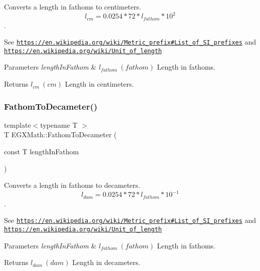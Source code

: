 Converts a length in fathoms to centimeters. \[ l_{cm}=0.0254 * 72 * l_{fathom} * 10^{2} \]. 

See \href{https://en.wikipedia.org/wiki/Metric_prefix#List_of_SI_prefixes}{\tt https\+://en.\+wikipedia.\+org/wiki/\+Metric\+\_\+prefix\#\+List\+\_\+of\+\_\+\+S\+I\+\_\+prefixes} and \href{https://en.wikipedia.org/wiki/Unit_of_length}{\tt https\+://en.\+wikipedia.\+org/wiki/\+Unit\+\_\+of\+\_\+length} 
\begin{DoxyParams}{Parameters}
{\em length\+In\+Fathom} & $ l_{fathom}\ (fathom)$ Length in fathoms. \\
\hline
\end{DoxyParams}
\begin{DoxyReturn}{Returns}
$ l_{cm}\ (cm)$ Length in centimeters. 
\end{DoxyReturn}
\mbox{\label{group___e_g_x_math-_conversions-_length_conversions-_imperial-_fathom-_s_i_ga58364998b467b74922de64f4e2f92825}} 
\subsubsection{\texorpdfstring{Fathom\+To\+Decameter()}{FathomToDecameter()}}
{\footnotesize\ttfamily template$<$typename T $>$ \\
T E\+G\+X\+Math\+::\+Fathom\+To\+Decameter (\begin{DoxyParamCaption}\item[{const T}]{length\+In\+Fathom }\end{DoxyParamCaption})}



Converts a length in fathoms to decameters. \[ l_{dam}=0.0254 * 72 * l_{fathom} * 10^{-1} \]. 

See \href{https://en.wikipedia.org/wiki/Metric_prefix#List_of_SI_prefixes}{\tt https\+://en.\+wikipedia.\+org/wiki/\+Metric\+\_\+prefix\#\+List\+\_\+of\+\_\+\+S\+I\+\_\+prefixes} and \href{https://en.wikipedia.org/wiki/Unit_of_length}{\tt https\+://en.\+wikipedia.\+org/wiki/\+Unit\+\_\+of\+\_\+length} 
\begin{DoxyParams}{Parameters}
{\em length\+In\+Fathom} & $ l_{fathom}\ (fathom)$ Length in fathoms. \\
\hline
\end{DoxyParams}
\begin{DoxyReturn}{Returns}
$ l_{dam}\ (dam)$ Length in decameters. 
\end{DoxyReturn}
\mbox{\label{group___e_g_x_math-_conversions-_length_conversions-_imperial-_fathom-_s_i_gaceb060a2b2455c407eacabd842fa4b59}} 
